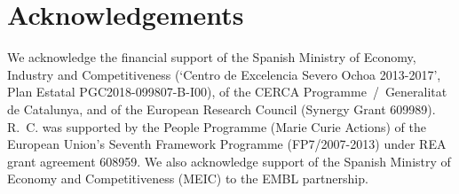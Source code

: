 \documentclass{article}
\begin{document}
\section*{Acknowledgements}

We acknowledge the financial support of the Spanish Ministry of Economy,
Industry and Competitiveness (`Centro de Excelencia Severo Ochoa
2013-2017', Plan Estatal PGC2018-099807-B-I00), of the CERCA
Programme~/~Generalitat de Catalunya, and of the European Research Council
(Synergy Grant 609989). R.~C. was supported by the People Programme
(Marie Curie Actions) of the European Union's Seventh Framework Programme
(FP7/2007-2013) under REA grant agreement 608959. We also acknowledge
support of the Spanish Ministry of Economy and Competitiveness (MEIC) to
the EMBL partnership.





\end{document}

